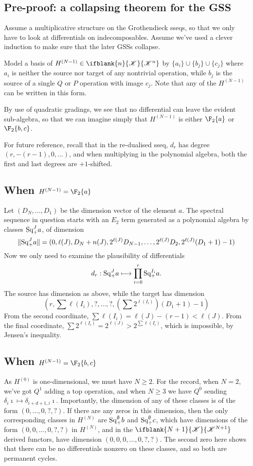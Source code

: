\documentclass[10pt]{article}
\newcommand{\LL}[1]{\ifblank{#1}{\scrK}{\scrK^{#1}}}
\renewcommand{\Q}{Q}
\newcommand{\SqShift}{\Sq_{\smash{+}}}
\newcommand{\Sq}{\mathrm{Sq}}
\begin{document}
\begin{grothendieck collapse}
\pagebreak
\section{Pre-proof: a collapsing theorem for the GSS}
Assume a multiplicative structure on the Grothendieck sseqs, so that we only have to look at differentials on indecomposables. Assume we've used a clever induction to make sure that the later GSSs collapse.

Model a basis of $H^{(N-1)}\in\LL{n}$ by $\{a_i\}\cup \{b_{j}\}\cup \{c_{j}\}$ where $a_i$ is neither the source nor target of any nontrivial operation, while $b_{j}$ is the source of a single $\Q$ or $P$ operation with image $c_j$. Note that any of the $H^{(N-1)}$ can be written in this form.

By use of quadratic gradings, we see that no differential can leave the evident sub-algebra, so that we can imagine simply that $H^{(N-1)}$ is either $\F_2\{a\}$ or $\F_2\{b,c\}$.

For future reference, recall that in the re-dualised sseq, $d_r$ has degree $(r,-(r-1),0,\ldots)$, and when multiplying in the polynomial algebra, both the first and last degrees are $+1$-shifted.
\subsection{When $H^{(N-1)}=\F_2\{a\}$}
Let $(D_N,\ldots,D_1)$ be the dimension vector of the element $a$.
The spectral sequence in question starts with an $E_2$ term generated as a polynomial algebra by classes $\SqShift^Ja$, of dimension
\[\|\SqShift^Ja\|=(0,\ell(J),D_N+n(J),2^{\ell(J)}D_{N-1},\ldots,2^{\ell(J)}D_{2},2^{\ell(J)}(D_{1}+1)-1)\]
Now we only need to examine the plausibility of differentials
\[d_r:\SqShift^Ja\mapsto \prod_{i=0}^r\SqShift^{I_i}a.\]
The source has dimension as above, while the target has dimension
\[(r,\textstyle\sum\ell(I_i),?,\ldots,?,(\textstyle\sum2^{\ell(I_i)})(D_{1}+1)-1)\]
From the second coordinate, $\sum\ell(I_i)=\ell(J)-(r-1)<\ell(J)$. From the final coordinate, $\sum2^{\ell(I_i)}=2^{\ell(J)}>2^{\sum\ell(I_i)}$, which is impossible, by Jensen's inequality.
\subsection{When $H^{(N-1)}=\F_2\{b,c\}$}
As $H^{(0)}$ is one-dimensional, we must have $N\geq2$. For the record, when $N=2$, we've got $Q^1$ adding a top operation, and when $N\geq3$ we have $Q^0$ sending $\delta_{i}\imath\mapsto \delta_{i+d+1,i}\imath$. Importantly, the dimension of any of these classes is of the form $(0,\ldots,0,?,?)$. If there are any zeros in this dimension, then the only corresponding classes in $H^{(N)}$ are $\SqShift^{\emptyset}b$ and $\SqShift^{\emptyset}c$, which have dimensions of the form $(0,0,\ldots,0,?,?)$ in $H^{(N)}$, and in the $\LL{N+1}$ derived functors, have dimension $(0,0,0,\ldots,0,?,?)$. The second zero here shows that there can be no differentials nonzero on these classes, and so both are permanent cycles.


\end{grothendieck collapse}
\end{document}
